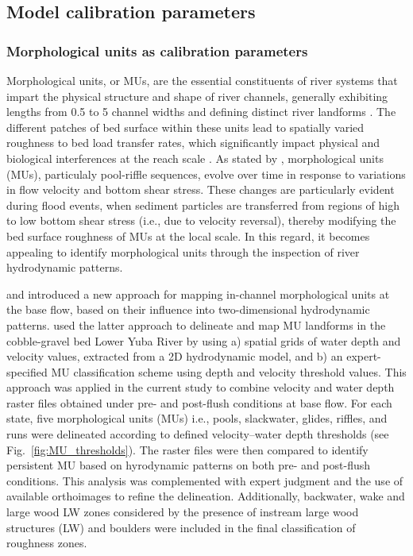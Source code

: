 \documentclass[draft,linenumbers,onecolumn]{agujournal2019} %
\begin{document}
\subsection{Model calibration parameters}
\label{sec:Sec2.5}

\subsubsection{Morphological units as calibration parameters}
Morphological units, or MUs, are the essential constituents of river systems that impart the physical structure and shape of river channels, generally exhibiting lengths from 0.5 to 5 channel widths and defining distinct river landforms \cite{woodworth2022are}. The different patches of bed surface within these units lead to spatially varied roughness to bed load transfer rates, which significantly impact physical and biological interferences at the reach scale \cite{buffington1999effects,dietrich2005sediment}. As stated by , morphological units (MUs), particulaly pool-riffle sequences, evolve over time in response to variations in flow velocity and bottom shear stress. These changes are particularly evident during flood events, when sediment particles are transferred from regions of high to low bottom shear stress (i.e., due to velocity reversal), thereby modifying the bed surface roughness of MUs at the local scale. In this regard, it becomes appealing to identify morphological units through the inspection of river hydrodynamic patterns. 

 and  introduced a new approach for mapping in-channel morphological units at the base flow, based on their influence into two-dimensional hydrodynamic patterns.  used the latter approach to delineate and map MU landforms in the cobble-gravel bed Lower Yuba River by using a) spatial grids of water depth and velocity values, extracted from a 2D hydrodynamic model, and b) an expert-specified MU classification scheme using depth and velocity threshold values. This approach was applied in the current study to combine velocity and water depth raster files obtained under pre- and post-flush conditions at base flow. For each state, five morphological units (MUs) i.e., pools, slackwater, glides, riffles, and runs were delineated according to defined velocity–water depth thresholds (see Fig.~\ref{fig:MU_thresholds}). The raster files were then compared to identify persistent MU based on hyrodynamic patterns on both pre- and post-flush conditions. This analysis was complemented with expert judgment and the use of available orthoimages to refine the delineation. Additionally, backwater, wake and large wood LW zones considered by the presence of instream large wood structures (LW) and boulders were included in the final classification of roughness zones.    
\end{document}
